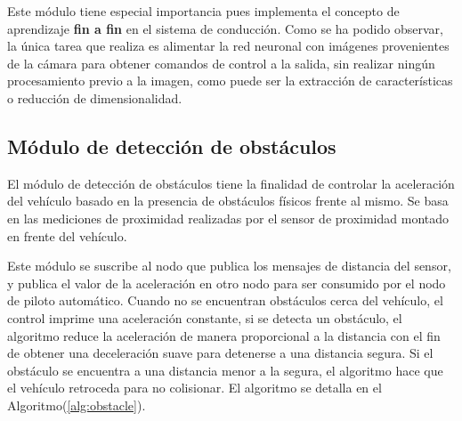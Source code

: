     Este módulo tiene especial importancia pues implementa el concepto de aprendizaje \textbf{fin a fin}
    en el sistema de conducción. Como se ha podido observar, la única tarea que realiza es alimentar la 
    red neuronal con imágenes provenientes de la cámara para obtener comandos de control a la salida, sin 
    realizar ningún procesamiento previo a la imagen, como puede ser la extracción  de características o reducción 
    de dimensionalidad.

    
    \subsection{Módulo de detección de obstáculos}
    El módulo de detección de obstáculos tiene la finalidad de controlar la aceleración del vehículo basado en la 
    presencia de obstáculos físicos frente al mismo. Se basa en las mediciones de proximidad realizadas por el 
    sensor de proximidad montado en frente del vehículo. 

    Este módulo se suscribe al nodo que publica los mensajes de distancia del sensor, y publica el valor de la aceleración 
    en otro nodo para ser consumido por el nodo de piloto automático. Cuando no se encuentran obstáculos cerca del vehículo, 
    el control imprime una aceleración constante, si se detecta un obstáculo, el algoritmo reduce la aceleración de manera 
    proporcional a la distancia con el fin de obtener una deceleración suave para detenerse a una distancia segura. Si el obstáculo 
    se encuentra a una distancia menor a la segura, el algoritmo hace que el vehículo retroceda para no colisionar. El algoritmo 
    se detalla en el Algoritmo(\ref{alg:obstacle}).

